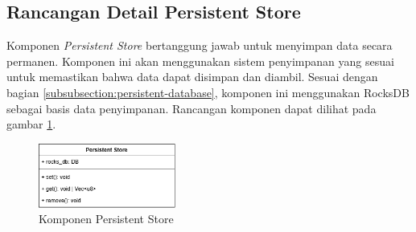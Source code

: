\subsection{Rancangan Detail Persistent Store}
\label{subsection:detail-persistent-store}

Komponen \textit{Persistent Store} bertanggung jawab untuk menyimpan data secara permanen. Komponen ini akan menggunakan sistem penyimpanan yang sesuai untuk memastikan bahwa data dapat disimpan dan diambil. Sesuai dengan bagian \ref{subsubsection:persistent-database}, komponen ini menggunakan RocksDB sebagai basis data penyimpanan. Rancangan komponen dapat dilihat pada gambar \ref{fig:persistent-store-component}.

\begin{figure}[ht]
    \centering
    \includegraphics[width=0.4\textwidth]{resources/chapter-3/persistent-store-component.png}
    \caption{Komponen Persistent Store}
    \label{fig:persistent-store-component}
\end{figure}